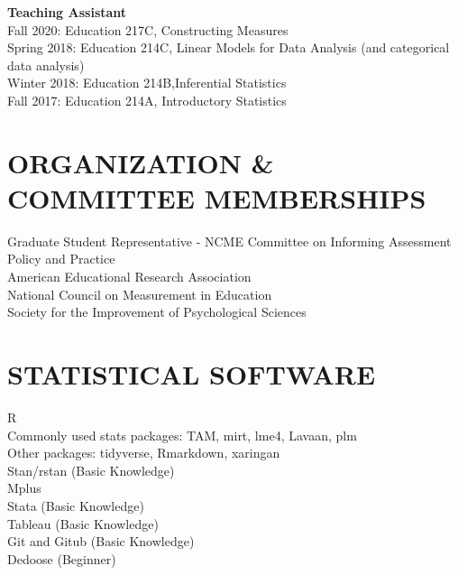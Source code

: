 \documentclass[12pt, oneside,]{memoir}
\begin{document}
\noindent \textbf{Teaching Assistant}\\
\hspace*{0.333em}\hspace*{0.333em}Fall 2020: Education 217C, Constructing Measures\\
\hspace*{0.333em}\hspace*{0.333em}Spring 2018: Education 214C, Linear Models for Data Analysis (and categorical data analysis)\\
\hspace*{0.333em}\hspace*{0.333em}Winter 2018: Education 214B,Inferential Statistics\\
\hspace*{0.333em}\hspace*{0.333em}Fall 2017: Education 214A, Introductory Statistics
\vspace{4mm}

\hypertarget{organization-committee-memberships}{%
\section{ORGANIZATION \& COMMITTEE
MEMBERSHIPS}\label{organization-committee-memberships}}

\noindent Graduate Student Representative - NCME Committee on Informing Assessment Policy and Practice\\
American Educational Research Association\\
National Council on Measurement in Education\\
Society for the Improvement of Psychological Sciences
\vspace{4mm}

\hypertarget{statistical-software}{%
\section{STATISTICAL SOFTWARE}\label{statistical-software}}
\noindent R\\
\hspace*{0.333em} Commonly used stats packages: TAM, mirt, lme4, Lavaan, plm\\
\hspace*{0.333em} Other packages: tidyverse, Rmarkdown, xaringan\\
\hspace*{0.333em}Stan/rstan (Basic Knowledge)\\
\noindent Mplus\\
\noindent Stata (Basic Knowledge)\\
Tableau (Basic Knowledge)\\
Git and Gitub (Basic Knowledge)\\
Dedoose (Beginner)
\end{document}
